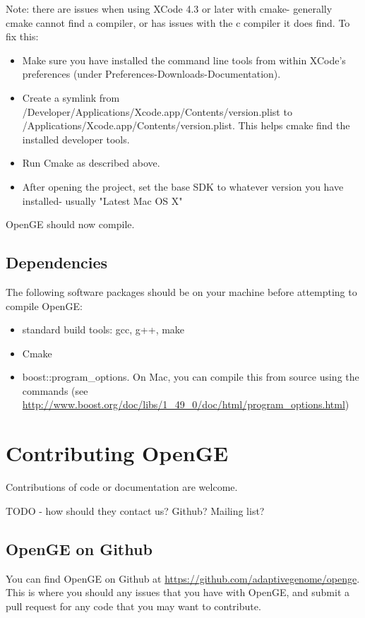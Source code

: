 \documentclass[11pt]{article}
\begin{document}
Note: there are issues when using XCode 4.3 or later with cmake- generally cmake cannot find a compiler, or has issues with the c compiler it does find. To fix this:
\begin{itemize}
\item Make sure you have installed the command line tools from within XCode's preferences (under Preferences-Downloads-Documentation).
\item Create a symlink from /Developer/Applications/Xcode.app/Contents/version.plist to /Applications/Xcode.app/Contents/version.plist. This helps cmake find the installed developer tools.
\item Run Cmake as described above.
\item After opening the project, set the base SDK to whatever version you have installed- usually "Latest Mac OS X"
\end{itemize}
OpenGE should now compile.

\subsection{Dependencies}
The following software packages should be on your machine before attempting to compile OpenGE:
\begin{itemize}
\item standard build tools: gcc, g++, make
\item Cmake
\item boost::program\_options. On Mac, you can compile this from source using the commands  (see \url{http://www.boost.org/doc/libs/1_49_0/doc/html/program_options.html})
\end{itemize}

\section {Contributing OpenGE}
Contributions of code or documentation are welcome.

TODO - how should they contact us? Github? Mailing list?

\subsection {OpenGE on Github}
You can find OpenGE on Github at \url{https://github.com/adaptivegenome/openge}. This is where you should any issues that you have with OpenGE, and submit a pull request for any code that you may want to contribute.
\end{document}

